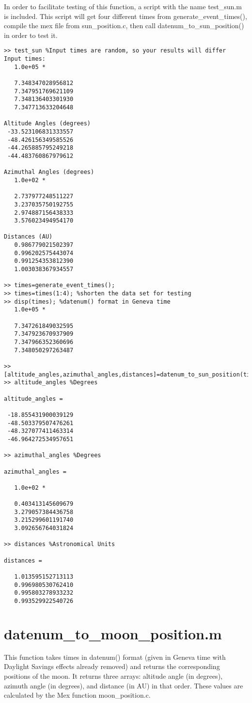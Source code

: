 \documentclass[12pt]{report}
\begin{document}
In order to facilitate testing of this function, a script with the name test\_sun.m is included.  This script will get four different times from generate\_event\_times(), compile the mex file from sun\_position.c, then call datenum\_to\_sun\_position() in order to test it.

\begin{verbatim}
>> test_sun %Input times are random, so your results will differ
Input times:
   1.0e+05 *

   7.348347028956812
   7.347951769621109
   7.348136403301930
   7.347713633204648

Altitude Angles (degrees)
 -33.523106831333557
 -48.426156349585526
 -44.265885795249218
 -44.483760867979612

Azimuthal Angles (degrees)
   1.0e+02 *

   2.737977248511227
   3.237035750192755
   2.974887156438333
   3.576023494954170

Distances (AU)
   0.986779021502397
   0.996202575443074
   0.991254353812390
   1.003038367934557

>> times=generate_event_times();
>> times=times(1:4); %shorten the data set for testing
>> disp(times); %datenum() format in Geneva time
   1.0e+05 *

   7.347261849032595
   7.347923670937909
   7.347966352360696
   7.348050297263487
 
>> [altitude_angles,azimuthal_angles,distances]=datenum_to_sun_position(times);
>> altitude_angles %Degrees

altitude_angles =

 -18.855431900039129
 -48.503379507476261
 -48.327077411463314
 -46.964272534957651

>> azimuthal_angles %Degrees

azimuthal_angles =

   1.0e+02 *

   0.403413145609679
   3.279057384436758
   3.215299601191740
   3.092656764031824

>> distances %Astronomical Units

distances =

   1.013595152713113
   0.996980530762410
   0.995803278933232
   0.993529922540726

\end{verbatim}

\section{datenum\_to\_moon\_position.m}
This function takes times in datenum() format (given in Geneva time with Daylight Savings effects already removed) and returns the corresponding positions of the moon.  It returns three arrays: altitude angle (in degrees), azimuth angle (in degrees), and distance (in AU) in that order.  These values are calculated by the Mex function moon\_position.c.  
\end{document}
